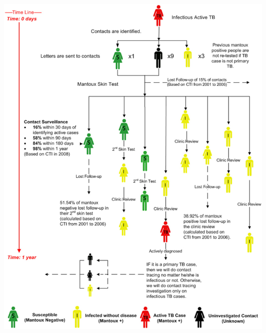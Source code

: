 \documentclass[aspectratio=43]{beamer}
\begin{document}
\begin{frame}
\begin{center}
\includegraphics[width=\textwidth]{FIGS/TianOsgood_etal_TB_CT.jpeg}
\end{center}
\end{frame}
\end{document}
